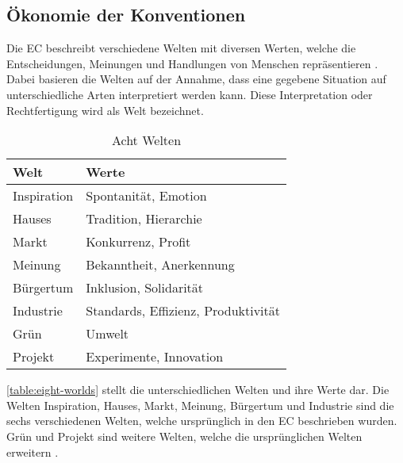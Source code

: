 \subsection{Ökonomie der Konventionen}
Die \ac{EC} beschreibt verschiedene \glqq Welten\grqq{} mit diversen Werten, welche die Entscheidungen, Meinungen und Handlungen von Menschen repräsentieren \cite{on-justification, oekonomie-konventionen}.
Dabei basieren die Welten auf der Annahme, dass eine gegebene Situation auf unterschiedliche Arten interpretiert werden kann.
Diese Interpretation oder Rechtfertigung wird als Welt bezeichnet.
\begin{center}
    \begin{table}[!ht]
        \centering
        \begin{tabular}{|l l|}
            \hline
            Welt        & Werte                               \\ \hline
            Inspiration & Spontanität, Emotion                \\
            Hauses      & Tradition, Hierarchie               \\
            Markt       & Konkurrenz, Profit                  \\
            Meinung     & Bekanntheit, Anerkennung            \\
            Bürgertum   & Inklusion, Solidarität              \\
            Industrie   & Standards, Effizienz, Produktivität \\ \hline \hline
            Grün        & Umwelt                              \\
            Projekt     & Experimente, Innovation             \\ \hline
        \end{tabular}
        \caption{Acht Welten}
        \label{table:eight-worlds}
    \end{table}
\end{center}

\autoref{table:eight-worlds} stellt die unterschiedlichen Welten und ihre Werte dar.
Die Welten Inspiration, Hauses, Markt, Meinung, Bürgertum und Industrie sind die sechs verschiedenen Welten, welche ursprünglich in den \ac{EC} beschrieben wurden.
Grün und Projekt sind weitere Welten, welche die ursprünglichen Welten erweitern \cite{ec-green, new-spirit-of-capitalism}.

